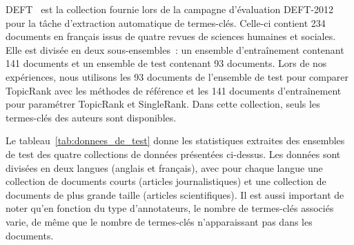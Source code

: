       DEFT~\cite{paroubek2012deft} est la collection fournie lors de la
      campagne d'évaluation DEFT-2012 pour la tâche d'extraction automatique de
      termes-clés. Celle-ci contient 234 documents en français issus de quatre
      revues de sciences humaines et sociales. Elle est divisée en deux
      sous-ensembles~: un ensemble d'entraînement contenant 141 documents et un
      ensemble de test contenant 93 documents. Lors de nos expériences, nous
      utilisons les 93 documents de l'ensemble de test pour comparer TopicRank
      avec les méthodes de référence et les 141 documents d'entraînement pour
      paramétrer TopicRank et SingleRank. Dans cette collection, seuls les
      termes-clés des auteurs sont disponibles.

      Le tableau~\ref{tab:donnees_de_test} donne les statistiques extraites des
      ensembles de test des quatre collections de données présentées ci-dessus.
      Les données sont divisées en deux langues (anglais et français), avec pour
      chaque langue une collection de documents courts (articles
      journalistiques) et une collection de documents de plus grande taille
      (articles scientifiques). Il est aussi important de noter qu'en fonction
      du type d'annotateurs, le nombre de termes-clés associés varie, de même
      que le nombre de termes-clés n'apparaissant pas dans les documents.
